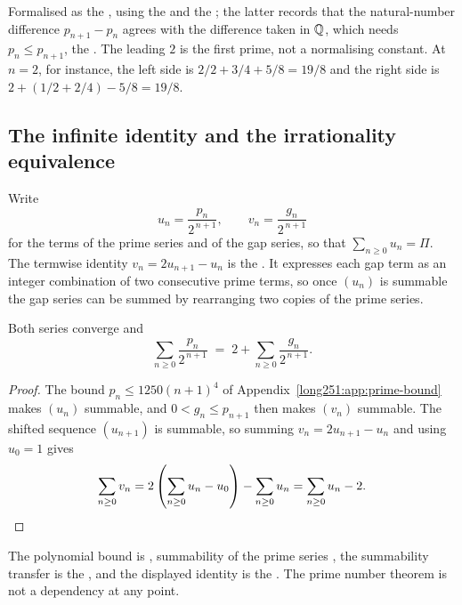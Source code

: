\documentclass[11pt]{article}
\begin{document}
\noindent Formalised as the
, using the
 and the
; the latter records that the natural-number difference
$p_{n+1}-p_n$ agrees with the difference taken in $\mathbb{Q}$, which needs
$p_n\le p_{n+1}$, the
.  The leading $2$ is the first prime, not a normalising constant.
At $n=2$, for instance, the left side is $2/2+3/4+5/8=19/8$ and the right side
is $2+(1/2+2/4)-5/8=19/8$.

\subsection{The infinite identity and the irrationality equivalence}\label{long251:sec:infinite}

Write
\[
 u_n=\frac{p_n}{2^{\,n+1}},\qquad
 v_n=\frac{g_n}{2^{\,n+1}}
\]
for the terms of the prime series and of the gap series, so that
$\sum_{n\ge0}u_n=\Pi$.  The termwise identity $v_n=2u_{n+1}-u_n$ is the
.  It expresses each gap term as an integer combination of
two consecutive prime terms, so once $(u_n)$ is summable the gap series can be
summed by rearranging two copies of the prime series.

\begin{theorem}\label{long251:res:infinite}
Both series converge and
\[
 \sum_{n\ge0}\frac{p_n}{2^{\,n+1}}
 \;=\;2+\sum_{n\ge0}\frac{g_n}{2^{\,n+1}} .
\]
\end{theorem}

\begin{proof}
The bound $p_n\le1250(n+1)^4$ of Appendix~\ref{long251:app:prime-bound} makes $(u_n)$
summable, and $0<g_n\le p_{n+1}$ then makes $(v_n)$ summable.  The shifted
sequence $(u_{n+1})$ is summable, so summing $v_n=2u_{n+1}-u_n$ and using
$u_0=1$ gives
\[
 \sum_{n\ge0}v_n
 =2\left(\sum_{n\ge0}u_n-u_0\right)-\sum_{n\ge0}u_n
 =\sum_{n\ge0}u_n-2 . \qedhere
\]
\end{proof}

\noindent The polynomial bound is
, summability of the prime series
,
the summability transfer is the
, and the displayed identity is the
.  The prime number theorem is not a dependency at any
point.
\end{document}
